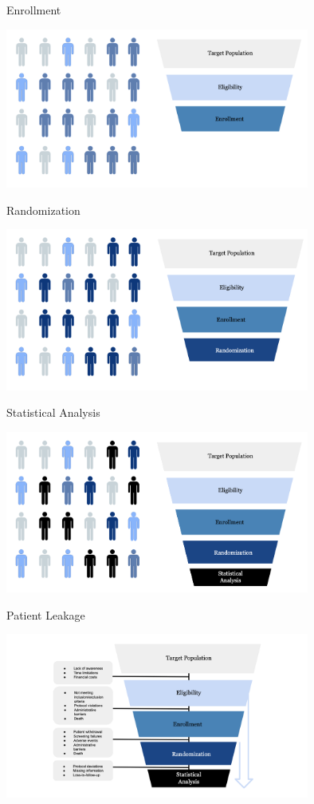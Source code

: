 \documentclass[english]{beamer}\usepackage[]{graphicx}\usepackage[]{xcolor}
\begin{document}
\begin{frame}{Enrollment}

\includegraphics[width=100mm,scale=1]{enrollment.png}


\end{frame}

\begin{frame}{Randomization}

\includegraphics[width=100mm,scale=1]{randomization.png}

\end{frame}

\begin{frame}{Statistical Analysis}

\includegraphics[width=100mm,scale=1]{statanal.png}

\end{frame}


\begin{frame}{Patient Leakage}

\includegraphics[width=100mm,scale=1]{attrition.png}

\end{frame}
\end{document}
